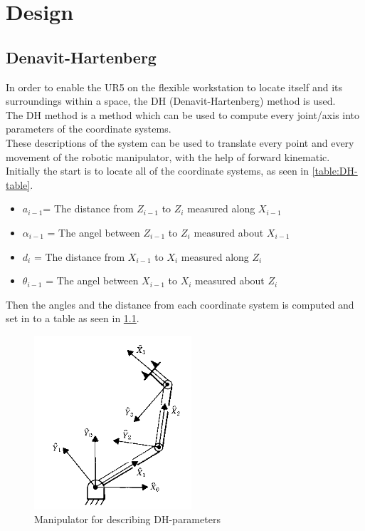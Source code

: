 \chapter{Design}

\section{Denavit-Hartenberg}

In order to enable the UR5 on the flexible workstation to locate itself and its surroundings within a space, the DH (Denavit-Hartenberg) method is used.\\ 
The DH method is a method which can be used to compute every joint/axis into parameters of the coordinate systems.\\
These descriptions of the system can be used to translate every point and every movement of the robotic manipulator, with the help of forward kinematic.\\
Initially the start is to locate all of the coordinate systems, as seen in \ref{table:DH-table}.\\ 


\begin{itemize}
    \item ${a_{i-1}}$= The distance from ${Z_{i-1}}$ to ${Z_{i}}$ measured along ${X_{i-1}}$
    \item ${\alpha_{i-1}}$ = The angel between ${Z_{i-1}}$ to ${Z_{i}}$ measured about ${X_{i-1}}$
    \item ${d_{i}}$ = The distance from ${X_{i-1}}$ to ${X_{i}}$ measured along ${Z_{i}}$
    \item ${\theta_{i-1}}$ = The angel between ${X_{i-1}}$ to ${X_{i}}$ measured about ${Z_{i}}$
\end{itemize}


\newpage

Then the angles and the distance from each coordinate system is computed and set in to a table as seen in \ref{fig:DH-Table}.

\begin{figure}[h]
    \centering
    \includegraphics[scale=1]{Design/DHmani.PNG}
    \caption{Manipulator for describing DH-parameters \cite{DH}} 
    \label{fig:DH-Table} 
\end{figure}

